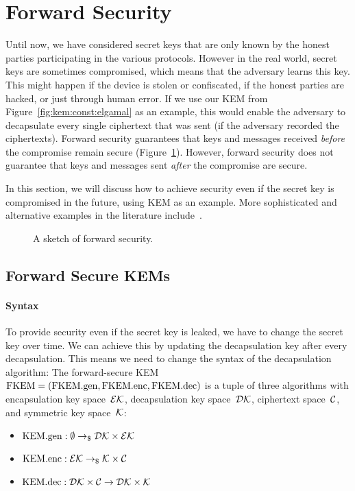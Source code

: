 \section{Forward Security}
\label{sec:forward-sec}

Until now, we have considered secret keys that are only known by the honest parties participating in the various protocols.
However in the real world, secret keys are sometimes compromised, which means that the adversary learns this key.
This might happen if the device is stolen or confiscated, if the honest parties are hacked, or just through human error.
If we use our KEM from Figure~\ref{fig:kem:const:elgamal} as an example, this would enable the adversary to decapsulate every single ciphertext that was sent (if the adversary recorded the ciphertexts).
Forward security guarantees that keys and messages received \emph{before} the compromise remain secure (Figure~\ref{fig:fs:sketch}).
However, forward security does not guarantee that keys and messages sent \emph{after} the compromise are secure.

In this section, we will discuss how to achieve security even if the secret key is compromised in the future, using KEM as an example.
More sophisticated and alternative examples in the literature include~\cite{SP:GreMie15,EC:CanHalKat03,EC:GHJL17}.

\begin{figure}[!ht]
    \centering
    
    \caption{A sketch of forward security.}
    \label{fig:fs:sketch}
\end{figure}

\subsection{Forward Secure KEMs}

\paragraph{Syntax} To provide security even if the secret key is leaked, we have to change the secret key over time.
We can achieve this by updating the decapsulation key after every decapsulation.
This means we need to change the syntax of the decapsulation algorithm:
The forward-secure KEM $\mathrm{FKEM}=(\mathrm{FKEM}.\mathrm{gen},\mathrm{FKEM}.\mathrm{enc},\mathrm{FKEM}.\mathrm{dec})$ is a tuple of three algorithms with encapsulation key space~$\mathcal{EK}$, decapsulation key space~$\mathcal{DK}$, ciphertext space~$\mathcal{C}$, and symmetric key space~$\mathcal{K}$:
\begin{itemize}
    \item $\mathrm{KEM}.\mathrm{gen}: \emptyset \to_\$ \mathcal{DK}\times\mathcal{EK}$
    \item $\mathrm{KEM}.\mathrm{enc}: \mathcal{EK} \to_\$ \mathcal{K}\times\mathcal{C}$
    \item $\mathrm{KEM}.\mathrm{dec}: \mathcal{DK}\times\mathcal{C} \to \mathcal{DK}\times\mathcal{K}$
\end{itemize}

